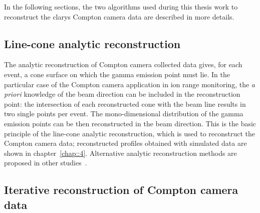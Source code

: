In the following sections, the two algorithms used during this thesis work to reconstruct the \gls{clarys} Compton camera data are described in more details.

\subsection{Line-cone analytic reconstruction}\label{chap2::subsec::LineConeRec} 

The analytic reconstruction of Compton camera collected data gives, for each event, a cone surface on which the gamma emission point must lie. In the particular case of the Compton camera application in ion range monitoring, the \textit{a priori} knowledge of the beam direction can be included in the reconstruction point: the intersection of each reconstructed cone with the beam line results in two single points per event. The mono-dimensional distribution of the gamma emission points can be then reconstructed in the beam direction. This is the basic principle of the line-cone analytic reconstruction, which is used to reconstruct the Compton camera data; reconstructed profiles obtained with simulated data are shown in chapter~\ref{chap::4}.
Alternative analytic reconstruction methods are proposed in other studies~\parencite{Cree1994, Basko1998, Parra1999, Hirasawa2003, Maxim2009}. 

\subsection{Iterative reconstruction of Compton camera data}\label{chap2::subsec::IterRec} 

